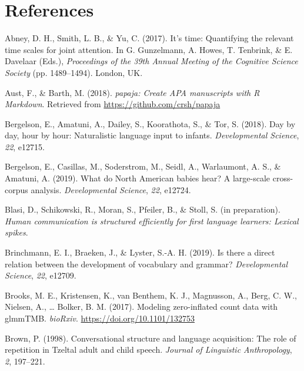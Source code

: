 \documentclass[floatsintext,man]{apa6}
\theoremstyle{definition}
\theoremstyle{definition}
\theoremstyle{definition}
\theoremstyle{remark}
\begin{document}
\newpage

\section{References}\label{refs}

\begingroup
\setlength{\parindent}{-0.5in} \setlength{\leftskip}{0.5in}

\hypertarget{refs}{}
\hypertarget{ref-abney2017time}{}
Abney, D. H., Smith, L. B., \& Yu, C. (2017). It's time: Quantifying the
relevant time scales for joint attention. In G. Gunzelmann, A. Howes, T.
Tenbrink, \& E. Davelaar (Eds.), \emph{Proceedings of the 39th Annual
Meeting of the Cognitive Science Society} (pp. 1489--1494). London, UK.

\hypertarget{ref-R-papaja}{}
Aust, F., \& Barth, M. (2018). \emph{papaja: Create APA manuscripts with
R Markdown}. Retrieved from \url{https://github.com/crsh/papaja}

\hypertarget{ref-bergelson2018day}{}
Bergelson, E., Amatuni, A., Dailey, S., Koorathota, S., \& Tor, S.
(2018). Day by day, hour by hour: Naturalistic language input to
infants. \emph{Developmental Science}, \emph{22}, e12715.

\hypertarget{ref-bergelsoncasillas2019what}{}
Bergelson, E., Casillas, M., Soderstrom, M., Seidl, A., Warlaumont, A.
S., \& Amatuni, A. (2019). What do North American babies hear? A
large-scale cross-corpus analysis. \emph{Developmental Science},
\emph{22}, e12724.

\hypertarget{ref-blasiIPhuman}{}
Blasi, D., Schikowski, R., Moran, S., Pfeiler, B., \& Stoll, S. (in
preparation). \emph{Human communication is structured efficiently for
first language learners: Lexical spikes}.

\hypertarget{ref-brinchmann2019direct}{}
Brinchmann, E. I., Braeken, J., \& Lyster, S.-A. H. (2019). Is there a
direct relation between the development of vocabulary and grammar?
\emph{Developmental Science}, \emph{22}, e12709.

\hypertarget{ref-brooks2017modeling}{}
Brooks, M. E., Kristensen, K., van Benthem, K. J., Magnusson, A., Berg,
C. W., Nielsen, A., \ldots{} Bolker, B. M. (2017). Modeling
zero-inflated count data with glmmTMB. \emph{bioRxiv}.
\url{https://doi.org/10.1101/132753}

\hypertarget{ref-brown1998conversational}{}
Brown, P. (1998). Conversational structure and language acquisition: The
role of repetition in Tzeltal adult and child speech. \emph{Journal of
Linguistic Anthropology}, \emph{2}, 197--221.
\end{document}
